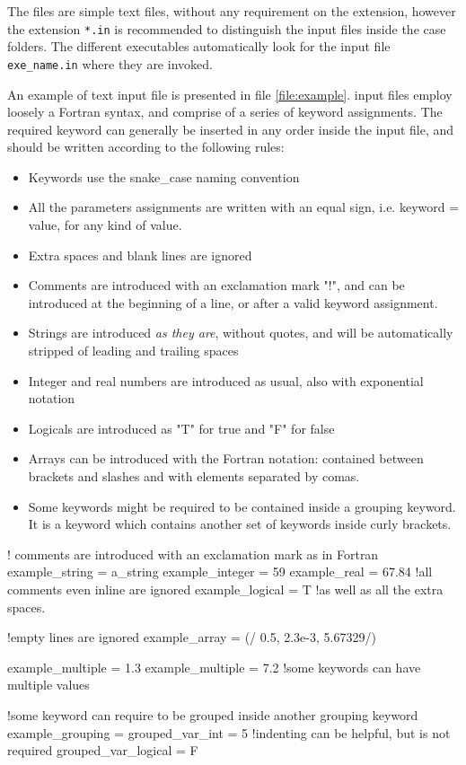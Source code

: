 The files are simple text files, without any requirement on the extension, however the extension \texttt{*.in} is recommended to distinguish the input files inside the case folders. The different executables automatically look for the input file \texttt{exe\_name.in} where they are invoked. 

An example of text input file is presented in file \ref{file:example}. input files employ loosely a Fortran syntax, and comprise of a series of keyword assignments.
The required keyword can generally be inserted in any order inside the input file, and should be written according to the following rules:
\begin{itemize}
\item Keywords use the snake_case naming convention
\item All the parameters assignments are written with an equal sign, i.e. keyword = value, for any kind of value.
\item Extra spaces and blank lines are ignored
\item Comments are introduced with an exclamation mark "!", and can be introduced at the beginning of a line, or after a valid keyword assignment.
\item Strings are introduced \emph{as they are}, without quotes, and will be automatically stripped of leading and trailing spaces
\item Integer and real numbers are introduced as usual, also with exponential notation
\item Logicals are introduced as "T" for true and "F" for false
\item Arrays can be introduced with the Fortran notation: contained between brackets and slashes and with elements separated by comas. 
\item Some keywords might be required to be contained inside a grouping keyword. It is a keyword which contains another set of keywords inside curly brackets. 
\end{itemize}

\begin{inputfile}[frame=single, caption={example input file}, label={file:example}]
! comments are introduced with an exclamation mark as in Fortran
example_string   = a_string
example_integer  = 59
example_real     = 67.84 !all comments even inline are ignored
example_logical  = T     !as well as all the extra spaces.

!empty lines are ignored
example_array = (/ 0.5, 2.3e-3, 5.67329/)

example_multiple = 1.3
example_multiple = 7.2 !some keywords can have multiple values

!some keyword can require to be grouped inside another grouping keyword
example_grouping = {
	grouped_var_int = 5 !indenting can be helpful, but is not required
    grouped_var_logical = F
}
\end{inputfile}


